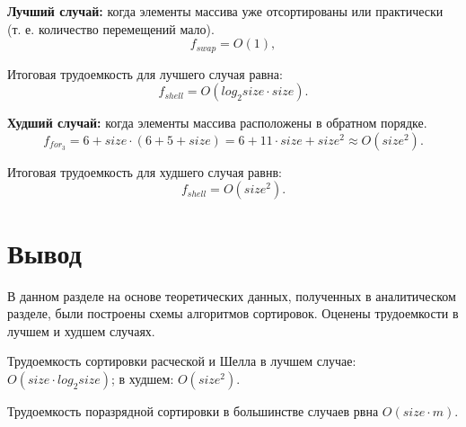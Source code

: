 \textbf{Лучший случай:} когда элементы массива уже отсортированы или практически (т. е. количество перемещений мало).
\begin{equation}
	f_{swap} = O(1), 
\end{equation}

Итоговая трудоемкость для лучшего случая равна: 
\begin{equation}
	f_{shell} = O(log_2{size} \cdot size).
\end{equation}

\textbf{Худший случай:} когда элементы массива расположены в обратном порядке.
\begin{equation}
	f_{for_{3}} = 6 + size \cdot (6 + 5 + size) = 6 + 11 \cdot size + size^2 \approx O(size^2).
\end{equation}

Итоговая трудоемкость для худшего случая равнв: 
\begin{equation}
	f_{shell} = O(size^2).
\end{equation}

\section*{Вывод}
В данном разделе на основе теоретических данных, полученных в аналитическом разделе, были построены схемы алгоритмов сортировок. 
Оценены трудоемкости в лучшем и худшем случаях. 

Трудоемкость сортировки расческой и Шелла в лучшем случае: $O(size \cdot log_2{size})$; в худшем: $O(size^2)$.

Трудоемкость поразрядной сортировки в большинстве случаев рвна $O(size \cdot m)$.









